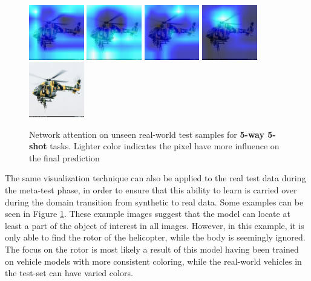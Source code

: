 \begin{figure}[H]
  {\includegraphics[height=2.4cm, width=2.4cm]{images/real-images/gradcam/5-5/3/Heat_map_of_iterations_0.png}}
  {\includegraphics[height=2.4cm, width=2.4cm]{images/real-images/gradcam/5-5/3/Heat_map_of_iterations_1.png}}
  {\includegraphics[height=2.4cm, width=2.4cm]{images/real-images/gradcam/5-5/3/Heat_map_of_iterations_3.png}}
%
  {\includegraphics[height=2.4cm, width=2.4cm]{images/real-images/gradcam/5-5/3/Heat_map_of_iterations_5.png}}
  {\includegraphics[height=2.4cm, width=2.4cm]{images/real-images/gradcam/5-5/3/Test_Images.png}}
  
\caption{Network attention on unseen real-world test samples for \textbf{5-way 5-shot} tasks. Lighter color indicates the pixel have more influence on the final prediction}
\label{grad-cam-real-5-5}
\end{figure}

The same visualization technique can also be applied to the real test data during the meta-test phase, in order to ensure that this ability to learn is carried over during the domain transition from synthetic to real data. Some examples can be seen in Figure \ref{grad-cam-real-5-5}. These example images suggest that the model can locate at least a part of the object of interest in all images. However, in this example, it is only able to find the rotor of the helicopter, while the body is seemingly ignored. The focus on the rotor is most likely a result of this model having been trained on vehicle models with more consistent coloring, while the real-world vehicles in the test-set can have varied colors.


